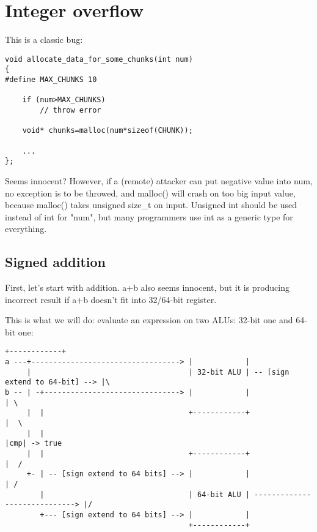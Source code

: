 \section{Integer overflow}

This is a classic bug:

\begin{lstlisting}[style=customc]
void allocate_data_for_some_chunks(int num)
{
#define MAX_CHUNKS 10

	if (num>MAX_CHUNKS)
		// throw error

	void* chunks=malloc(num*sizeof(CHUNK));

	...
};
\end{lstlisting}

Seems innocent? However, if a (remote) attacker can put negative value into num, no exception is to be throwed, and malloc() will crash
on too big input value, because malloc() takes unsigned size\_t on input.
Unsigned int should be used instead of int for "num", but many programmers use int as a generic type for everything.

\subsection{Signed addition}

First, let's start with addition.
a+b also seems innocent, but it is producing incorrect result if a+b doesn't fit into 32/64-bit register.

This is what we will do: evaluate an expression on two ALUs: 32-bit one and 64-bit one:

\begin{lstlisting}[basicstyle=\footnotesize]
                                          +------------+
a ---+----------------------------------> |            |
     |                                    | 32-bit ALU | -- [sign extend to 64-bit] --> |\
b -- | -+-------------------------------> |            |                                | \
     |  |                                 +------------+                                |  \
     |  |                                                                               |cmp| -> true
     |  |                                 +------------+                                |  /
     +- | -- [sign extend to 64 bits] --> |            |                                | /
        |                                 | 64-bit ALU | -----------------------------> |/
        +--- [sign extend to 64 bits] --> |            |
                                          +------------+
\end{lstlisting}

